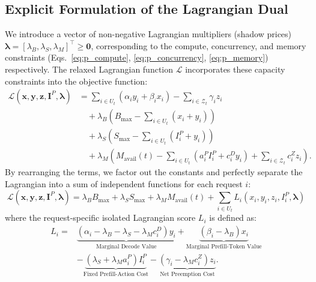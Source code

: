 \documentclass[11pt]{article}
\begin{document}

\subsection{Explicit Formulation of the Lagrangian Dual}
\label{subsec:lagrangian_dual}

We introduce a vector of non-negative Lagrangian multipliers (shadow prices) $\boldsymbol{\lambda} = [\lambda_B, \lambda_S, \lambda_M]^\top \ge \mathbf{0}$, corresponding to the compute, concurrency, and memory constraints (Eqs.~\ref{eq:p_compute}, \ref{eq:p_concurrency}, \ref{eq:p_memory}) respectively. The relaxed Lagrangian function $\mathcal{L}$ incorporates these capacity constraints into the objective function:
\begin{align}
    \mathcal{L}
    (\mathbf{x},\mathbf{y},\mathbf{z},\mathbf{I}^P,\boldsymbol{\lambda})
    &=
    \sum_{i\in U_t}
    \left(
        \alpha_i y_i+\beta_i x_i
    \right)
    -
    \sum_{i\in\mathcal{Z}_t}
    \gamma_i z_i
    \nonumber\\
    &\quad
    +
    \lambda_B
    \left(
        B_{\max}
        -
        \sum_{i\in U_t}(x_i+y_i)
    \right)
    \nonumber\\
    &\quad
    +
    \lambda_S
    \left(
        S_{\max}
        -
        \sum_{i\in U_t}(I_i^P+y_i)
    \right)
    \nonumber\\
    &\quad
    +
    \lambda_M
    \left(
        M_{\mathrm{avail}}(t)
        -
        \sum_{i\in U_t}
        \left(
            a_i^P I_i^P+c_i^D y_i
        \right)
        +
        \sum_{i\in\mathcal{Z}_t}
        c_i^Z z_i
    \right).
\end{align}
By rearranging the terms, we factor out the constants and perfectly separate the Lagrangian into a sum of independent functions for each request $i$:
\begin{equation}
    \mathcal{L}(\mathbf{x}, \mathbf{y}, \mathbf{z}, \mathbf{I}^P, \boldsymbol{\lambda}) = \lambda_B B_{\max} + \lambda_S S_{\max} + \lambda_M M_{\mathrm{avail}}(t) + \sum_{i \in U_t} L_i(x_i, y_i, z_i, I_i^P, \boldsymbol{\lambda})
\end{equation}
where the request-specific isolated Lagrangian score $L_i$ is defined as:
\begin{equation}
\label{eq:exact_lagrangian_score}
\begin{aligned}
L_i
={}&
\underbrace{
\left(
    \alpha_i-\lambda_B-\lambda_S-\lambda_Mc_i^D
\right)y_i
}_{\text{Marginal Decode Value}}
+
\underbrace{
\left(
    \beta_i-\lambda_B
\right)x_i
}_{\text{Marginal Prefill-Token Value}}
\\
&-
\underbrace{
\left(
    \lambda_S+\lambda_Ma_i^P
\right)I_i^P
}_{\text{Fixed Prefill-Action Cost}}
-
\underbrace{
\left(
    \gamma_i-\lambda_Mc_i^Z
\right)z_i
}_{\text{Net Preemption Cost}}.
\end{aligned}
\end{equation}
\end{document}
